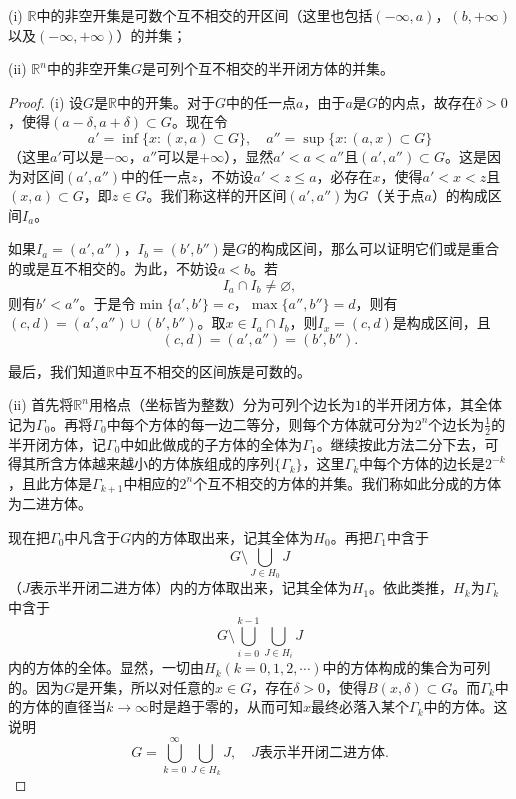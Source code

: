 \documentclass[lang=cn,newtx,10pt,scheme=chinese]{../Template/elegantbook}
\begin{document}
\begin{theorem}\label{theorem:Rn中的非空开集的性质}
(i) \(\mathbb{R}\)中的非空开集是可数个互不相交的开区间（这里也包括\((-\infty,a)\)，\((b,+\infty)\)以及\((-\infty,+\infty)\)）的并集；

(ii) \(\mathbb{R}^n\)中的非空开集\(G\)是可列个互不相交的半开闭方体的并集。
\end{theorem}
\begin{proof}
  (i) 设\(G\)是\(\mathbb{R}\)中的开集。对于\(G\)中的任一点\(a\)，由于\(a\)是\(G\)的内点，故存在\(\delta>0\)，使得\((a - \delta,a + \delta)\subset G\)。现在令
\[a'=\inf\{x:(x,a)\subset G\},\quad a''=\sup\{x:(a,x)\subset G\}\]
（这里\(a'\)可以是\(-\infty\)，\(a''\)可以是\(+\infty\)），显然\(a'<a<a''\)且\((a',a'')\subset G\)。这是因为对区间\((a',a'')\)中的任一点\(z\)，不妨设\(a'<z\leqslant a\)，必存在\(x\)，使得\(a'<x<z\)且\((x,a)\subset G\)，即\(z\in G\)。我们称这样的开区间\((a',a'')\)为\(G\)（关于点\(a\)）的构成区间\(I_a\)。

如果\(I_a=(a',a'')\)，\(I_b=(b',b'')\)是\(G\)的构成区间，那么可以证明它们或是重合的或是互不相交的。为此，不妨设\(a < b\)。若
\[I_a\cap I_b\neq\varnothing,\]
则有\(b'<a''\)。于是令\(\min\{a',b'\}=c\)，\(\max\{a'',b''\}=d\)，则有\((c,d)=(a',a'')\cup(b',b'')\)。取\(x\in I_a\cap I_b\)，则\(I_x=(c,d)\)是构成区间，且
\[(c,d)=(a',a'')=(b',b'').\]

最后，我们知道\(\mathbb{R}\)中互不相交的区间族是可数的。

(ii) 首先将\(\mathbb{R}^n\)用格点（坐标皆为整数）分为可列个边长为\(1\)的半开闭方体，其全体记为\(\Gamma_0\)。再将\(\Gamma_0\)中每个方体的每一边二等分，则每个方体就可分为\(2^n\)个边长为\(\frac{1}{2}\)的半开闭方体，记\(\Gamma_0\)中如此做成的子方体的全体为\(\Gamma_1\)。继续按此方法二分下去，可得其所含方体越来越小的方体族组成的序列\(\{\Gamma_k\}\)，这里\(\Gamma_k\)中每个方体的边长是\(2^{-k}\)，且此方体是\(\Gamma_{k + 1}\)中相应的\(2^n\)个互不相交的方体的并集。我们称如此分成的方体为二进方体。

现在把\(\Gamma_0\)中凡含于\(G\)内的方体取出来，记其全体为\(H_0\)。再把\(\Gamma_1\)中含于
\[G\setminus\bigcup_{J\in H_0}J\]
（\(J\)表示半开闭二进方体）内的方体取出来，记其全体为\(H_1\)。依此类推，\(H_k\)为\(\Gamma_k\)中含于
\[G\setminus\bigcup_{i = 0}^{k - 1}\bigcup_{J\in H_i}J\]
内的方体的全体。显然，一切由\(H_k(k = 0,1,2,\cdots)\)中的方体构成的集合为可列的。因为\(G\)是开集，所以对任意的\(x\in G\)，存在\(\delta>0\)，使得\(B(x,\delta)\subset G\)。而\(\Gamma_k\)中的方体的直径当\(k\rightarrow\infty\)时是趋于零的，从而可知\(x\)最终必落入某个\(\Gamma_k\)中的方体。这说明
\[G=\bigcup_{k = 0}^{\infty}\bigcup_{J\in H_k}J,\quad J表示半开闭二进方体.\]


\end{proof}
\end{document}
